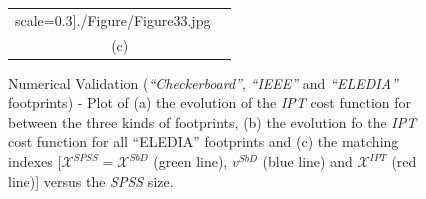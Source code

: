 \begin{figure}[H]
\begin{center}
\begin{tabular}{cc}
{  scale=0.3]{./Figure/Figure33.jpg}}\tabularnewline
\multicolumn{2}{c}{(c)}\tabularnewline
\end{tabular}\end{center}

\vspace{-20pt}
\caption{\footnotesize\footnotesize\label{cap:Cost_F}Numerical Validation (\emph{{}``Checkerboard''},
\emph{{}``IEEE''} and \emph{{}``ELEDIA''} footprints) - Plot of
(a) the evolution of the \emph{IPT} cost function for between the
three kinds of footprints, (b) the evolution fo the \emph{IPT} cost
function for all {}``ELEDIA'' footprints and (c) the matching indexes
{[}$\mathcal{X}^{SPSS}=\mathcal{X}^{SbD}$ (green line), $v^{SbD}$
(blue line) and $\mathcal{X}^{IPT}$ (red line){]} versus the \emph{SPSS}
size. }
\end{figure}